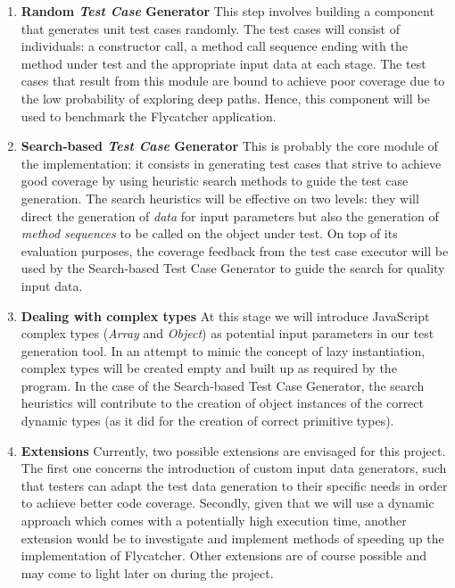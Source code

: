 \documentclass[a4paper,11pt,titlepage]{report}
\begin{document}
\begin{enumerate}
	\item{\textbf{Random \emph{Test Case} Generator}} This step involves building a component that generates unit test cases randomly. The test cases will consist of individuals: a constructor call, a method call sequence ending with the method under test and the appropriate input data at each stage. The test cases that result from this module are bound to achieve poor coverage due to the low probability of exploring deep paths. Hence, this component will be used to benchmark the \textsf{Flycatcher} application.
	

	\item{\textbf{Search-based \emph{Test Case} Generator}} This is probably the core module of the implementation: it consists in generating test cases that strive to achieve good coverage by using heuristic search methods to guide the test case generation. The search heuristics will be effective on two levels: they will direct the generation of \emph{data} for input parameters but also the generation of \emph{method sequences} to be called on the object under test. On top of its evaluation purposes, the coverage feedback from the test case executor will be used by the Search-based Test Case Generator to guide the search for quality input data.

	\item{\textbf{Dealing with complex types}}
At this stage we will introduce JavaScript complex types (\emph{Array} and \emph{Object}) as potential input parameters in our test generation tool. In an attempt to mimic the concept of lazy instantiation, complex types will be created empty and built up as required by the program. In the case of the Search-based Test Case Generator, the search heuristics will contribute to the creation of object instances of the correct dynamic types (as it did for the creation of correct primitive types).
		
	\item{\textbf{Extensions}} Currently, two possible extensions are envisaged for this project. The first one concerns the introduction of custom input data generators, such that testers can adapt the test data generation to their specific needs in order to achieve better code coverage. Secondly, given that we will use a dynamic approach which comes with a potentially high execution time, another extension would be to investigate and implement methods of speeding up the implementation of \textsf{Flycatcher}. Other extensions are of course possible and may come to light later on during the project.
		

\end{enumerate}
\end{document}
